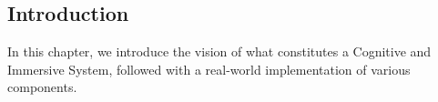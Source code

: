 \subsection{Introduction}

In this chapter, we introduce the vision of what constitutes a Cognitive and
Immersive System, followed with a real-world implementation of various
components.
